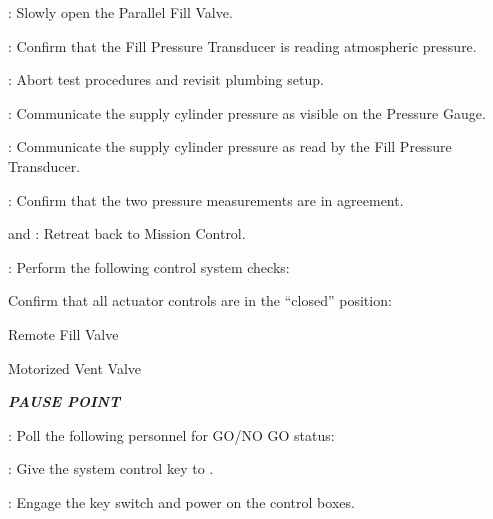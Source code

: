 \begin{checklist}
\begin{checklist}[label=$\bullet$]
\begin{checklist}
            \item \primary{}: Slowly open the Parallel Fill Valve.
            \item \daq{}: Confirm that the Fill Pressure Transducer is reading atmospheric pressure.
            \item \ops{}: Abort test procedures and revisit plumbing setup.
        \end{checklist}
    \end{checklist}
    \item \primary{}: Communicate the supply cylinder pressure as visible on the Pressure Gauge.
    \item \daq{}: Communicate the supply cylinder pressure as read by the Fill Pressure Transducer.
    \item \daq{}: Confirm that the two pressure measurements are in agreement.
    \item \primary{} and \secondary{}: Retreat back to Mission Control.
    \item \control{}: Perform the following control system checks:
    \begin{checklist}
        \item Confirm that all actuator controls are in the ``closed'' position:
        \begin{checklist}
            \item Remote Fill Valve
            \item Motorized Vent Valve
        \end{checklist}
    \end{checklist}
    \item \textbf{\textit{PAUSE POINT}}
    \item \ops{}: Poll the following personnel for GO/NO GO status:
    \begin{checklist}
        \item \heat{}
	\item \control{}
        \item \daq{}
        \item \primary{}
        \item \secondary{}
	\item \peri{}
	\item \perii{}
	\item \periii{}
    \end{checklist}
    \item \ops: Give the system control key to \control{}.
    \item \control{}: Engage the key switch and power on the control boxes.

\end{checklist}
